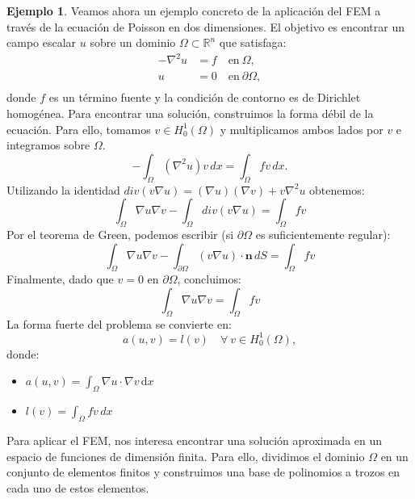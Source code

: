 \documentclass[a4paper,11pt,spanish, twoside, leqno]{tfg-uam}
\theoremstyle{definition}
\newtheorem{exmp}[teor]{Ejemplo}
\begin{document}
\begin{mdframed}  
\begin{exmp}
    Veamos ahora un ejemplo concreto de la aplicación del FEM a través de la ecuación de Poisson en dos dimensiones. El objetivo es encontrar un campo escalar $ u $ sobre un dominio $\Omega \subset \mathbb{R}^n$ que satisfaga:
    \begin{equation}
    \begin{aligned}
    - \nabla^2 u &= f \quad \text{en} \ \Omega, \\
    u &= 0 \quad \text{en} \ \partial\Omega, \\
    \end{aligned}
    \end{equation}
    donde $ f $ es un término fuente y la condición de contorno es de Dirichlet homogénea. Para encontrar una solución, construimos la forma débil de la ecuación. Para ello, tomamos $v\in H_0^1(\Omega)$ y multiplicamos ambos lados por $v$ e integramos sobre $\Omega$.
    \begin{equation*}
        -\int_{\Omega} (\nabla^2 u) v \, dx = \int_{\Omega} f v \, dx.
    \end{equation*}
    Utilizando la identidad $div(v\nabla u) = (\nabla u)(\nabla v) + v \nabla^2u$ obtenemos:
    \begin{equation*}
    \int_{\Omega} \nabla u \nabla v - \int_{\Omega} div(v \nabla u) = \int_{\Omega} f v
    \end{equation*}
    Por el teorema de Green, podemos escribir (si \(\partial \Omega\) es suficientemente regular):
    \begin{equation*}
    \int_{\Omega} \nabla u \nabla v - \int_{\partial \Omega} (v \nabla u) \cdot \mathbf{n} \, dS = \int_{\Omega} f v
    \end{equation*}
    Finalmente, dado que \(v = 0\) en \(\partial \Omega\), concluimos:
    \begin{equation*}
    \int_{\Omega} \nabla u \nabla v = \int_{\Omega} f v
    \end{equation*}
    La forma fuerte del problema se convierte en: 
    \begin{equation}\label{eq:forma_debil_poisson}
    a(u, v) = l(v) \quad \forall \ v \in H_0^1(\Omega),
    \end{equation}
    donde:
    \begin{itemize}
        \item $ a(u, v) = \int_{\Omega} \nabla u \cdot \nabla v \, \text{d}x $
        \item $ l(v) = \int_{\Omega} f v \, dx $
    \end{itemize}
    Para aplicar el FEM, nos interesa encontrar una solución aproximada en un espacio de funciones de dimensión finita. Para ello, dividimos el dominio $\Omega$ en un conjunto de elementos finitos y construimos una base de polinomios a trozos en cada uno de estos elementos. 
    

\end{exmp}
\end{mdframed}
\end{document}
